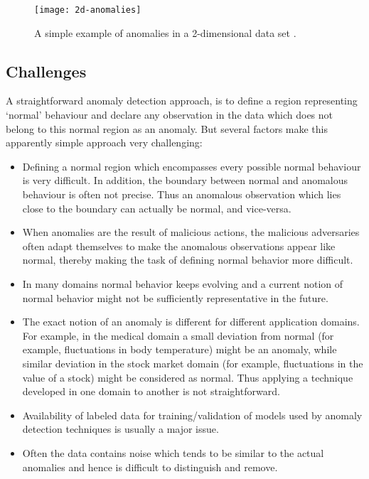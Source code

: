 \begin{figure}
\centering
\texttt{[image: 2d-anomalies]}
\caption[A simple example of anomalies in a 2-dimensional data set.]{A simple 
example of anomalies in a 2-dimensional data set \cite{Chandola:2007}.}
\label{fig:2d-anomalies}
\end{figure}

\subsection{Challenges}
\label{sec:anomalyDetectionChallenges}
A straightforward anomaly detection approach, is to define a region representing
`normal' behaviour and declare any observation in the data which does not belong
to this normal region as an anomaly. But several factors make this apparently 
simple approach very challenging:

\begin{itemize}
\item Defining a normal region which encompasses every possible normal behaviour 
is very difficult. In addition, the boundary between normal and anomalous 
behaviour is often not precise. Thus an anomalous observation which lies close
to the boundary can actually be normal, and vice-versa.
\item When anomalies are the result of malicious actions, the malicious 
adversaries often adapt themselves to make the anomalous observations appear 
like normal, thereby making the task of defining normal behavior more difficult.
\item In many domains normal behavior keeps evolving and a current notion of
normal behavior might not be sufficiently representative in the future.
\item The exact notion of an anomaly is different for different application 
domains. For example, in the medical domain a small deviation from normal (for
example, fluctuations in body temperature) might be an anomaly, while similar 
deviation in the stock market domain (for example, fluctuations in the value of 
a stock) might be considered as normal. Thus applying a technique developed in 
one domain to another is not straightforward.
\item Availability of labeled data for training/validation of models used by 
anomaly detection techniques is usually a major issue.
\item Often the data contains noise which tends to be similar to the actual 
anomalies and hence is difficult to distinguish and remove.
\end{itemize}

